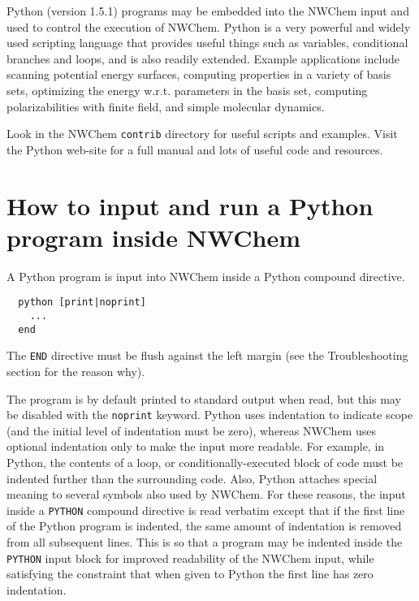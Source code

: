 %
%
\label{sec:python}

Python (version 1.5.1) programs may be embedded into the NWChem input
and used to control the execution of NWChem.  Python is a very
powerful and widely used scripting language that provides useful
things such as variables, conditional branches and loops, and is also
readily extended.  Example applications include scanning potential
energy surfaces, computing properties in a variety of basis sets,
optimizing the energy w.r.t. parameters in the basis set, computing
polarizabilities with finite field, and simple molecular dynamics.

Look in the NWChem \verb+contrib+ directory for useful scripts and
examples. Visit the Python web-site 
for a full manual and lots of useful code and resources.  

\section{How to input and run a Python program inside NWChem}

A Python program is input into NWChem inside a Python compound directive.
\begin{verbatim}
  python [print|noprint]
    ...
  end
\end{verbatim}
The \verb+END+ directive must be flush against the left
margin (see the Troubleshooting section for the reason why).

The program is by default printed to standard output when read, but
this may be disabled with the \verb+noprint+ keyword.  Python uses
indentation to indicate scope (and the initial level of indentation
must be zero), whereas NWChem uses optional indentation only to make
the input more readable.  For example, in Python, the contents of a
loop, or conditionally-executed block of code must be indented further
than the surrounding code.  Also, Python attaches special meaning to
several symbols also used by NWChem.  For these reasons, the input
inside a \verb+PYTHON+ compound directive is read verbatim except that
if the first line of the Python program is indented, the same amount
of indentation is removed from all subsequent lines.  This is so that
a program may be indented inside the \verb+PYTHON+ input block for
improved readability of the NWChem input, while satisfying the
constraint that when given to Python the first line has zero
indentation.

